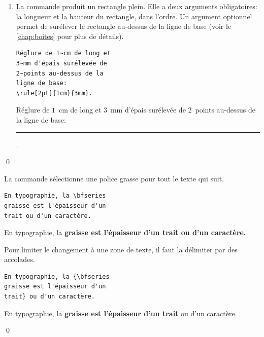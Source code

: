 \begin{exemple}
\begin{enumerate}
\begin{demo}
\begin{texample}
        connaître la syntaxe de
        {\LaTeX}.
      \end{texample}
    \end{demo}
  \item La commande \cmd{\rule} produit un rectangle plein. Elle a
    deux arguments obligatoires: la longueur et la hauteur du
    rectangle, dans l'ordre. Un argument optionnel permet de surélever
    le rectangle au-dessus de la ligne de base (voir le
    \autoref{chap:boites} pour plus de détails).
    \begin{demo}
      \begin{texample}
\begin{lstlisting}
Réglure de 1~cm de long et
3~mm d'épais surélevée de
2~points au-dessus de la
ligne de base:
\rule[2pt]{1cm}{3mm}.
\end{lstlisting}
        \producing
        Réglure de $1$~cm de long et
        $3$~mm d'épais surélevée de
        $2$~points au-dessus de la
        ligne de base: \rule[2pt]{1cm}{3mm}.
      \end{texample}
    \end{demo}
  \end{enumerate}
  \qed
\end{exemple}

\begin{exemple}
  La commande \cmd{\bfseries} sélectionne une police
  grasse pour tout le texte qui suit.
  \begin{demo}
    \begin{texample}
\begin{lstlisting}
En typographie, la \bfseries
graisse est l'épaisseur d'un
trait ou d'un caractère.
\end{lstlisting}
      \producing
      En typographie, la \bfseries
      graisse est l'épaisseur d'un
      trait ou d'un caractère.
    \end{texample}
  \end{demo}
  Pour limiter le changement à une zone de texte, il faut la délimiter
  par des accolades.
\begin{demo}
    \begin{texample}
\begin{lstlisting}
En typographie, la {\bfseries
graisse est l'épaisseur d'un
trait} ou d'un caractère.
\end{lstlisting}
      \producing
      En typographie, la {\bfseries
      graisse est l'épaisseur d’un
      trait} ou d’un caractère.
    \end{texample}
  \end{demo}
  \qed
\end{exemple}

